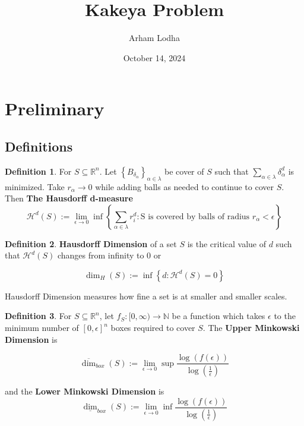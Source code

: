 \documentclass{article}
\newcommand*{\subeq}{\subseteq}
\newcommand{\R}{\mathbb{R}}
\newcommand{\N}{\mathbb{N}}
\theoremstyle{definition}
\newtheorem{definition}{Definition}[section]
\begin{document}
\title{Kakeya Problem}
\author{Arham Lodha}%
\date{October 14, 2024}%
\maketitle

\section{Preliminary}
\subsection{Definitions}
\begin{definition}
    For $S \subeq \R^n$. Let $\left\{ B_{\delta_\alpha} \right\}_{\alpha \in \lambda}$ be cover of $S$ such that $\sum_{\alpha \in \lambda} \delta_\alpha^d$ is minimized. Take $r_\alpha \to 0$ while adding balls as needed to continue to cover $S$. Then \textbf{The Hausdorff d-measure} \[\mathcal{H}^d(S) := \lim_{\epsilon \to 0} \inf \left\{ \sum_{\alpha \in \lambda} r_i^d : \text{S is covered by balls of radius $r_\alpha < \epsilon$} \right\}\]     
\end{definition}

\bigskip

\begin{definition}
    \textbf{Hausdorff Dimension} of a set $S$ is the critical value of $d$ such that $\mathcal{H}^d(S)$ changes from infinity to 0 or
    
    \[\dim_H(S) := \inf \left\{ d : \mathcal{H}^d(S) = 0 \right\}\]

    Hausdorff Dimension measures how fine a set is at smaller and smaller scales. 
\end{definition}

\bigskip

\begin{definition}
    For $S \subeq \R^n$, let $f_S: [0, \infty) \to \N$ be a function which takes $\epsilon$ to the minimum number of $[0, \epsilon]^n$ boxes required to cover $S$.   
    The \textbf{Upper Minkowski Dimension} is 
    
    \[\overline{\dim}_{box}(S) := \lim_{\epsilon \to 0} \sup \frac{\log(f(\epsilon))}{\log(\frac{1}{\epsilon})}\]
    
    and the \textbf{Lower Minkowski Dimension} is
    \[\underline{\dim}_{box}(S) := \lim_{\epsilon \to 0} \inf \frac{\log(f(\epsilon))}{\log(\frac{1}{\epsilon})}\]
\end{definition}
\end{document}
